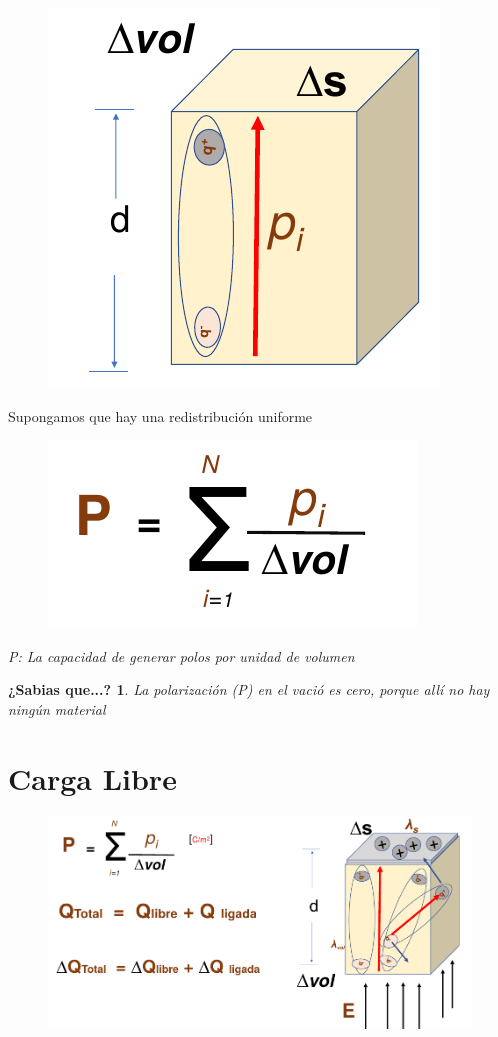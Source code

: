 \documentclass[12pt,letterpaper]{book}
\newtheorem{sabias}{¿Sabias que...?}[section]
\begin{document}
\begin{figure}[H]
\centering
\includegraphics[width=.5\linewidth]{figures/pol51.png}
\caption{}
\label{pol51}
\end{figure}
\vspace{0.2cm}

Supongamos que hay una redistribución uniforme

\begin{figure}[H]
\centering
\includegraphics[width=.5\linewidth]{figures/pol4.png}
\caption{}
\label{pol4}
\end{figure}
\vspace{0.2cm}

\textit{P: La capacidad de generar polos por unidad de volumen}
\begin{sabias}
La polarización (P) en el vació es cero, porque allí no hay ningún material
\end{sabias}

\section{Carga Libre}



\begin{figure}[H]
\centering
\includegraphics[width=1\linewidth]{figures/carFre.png}
\caption{}
\label{carFre}
\end{figure}
\vspace{0.2cm}
\end{document}
